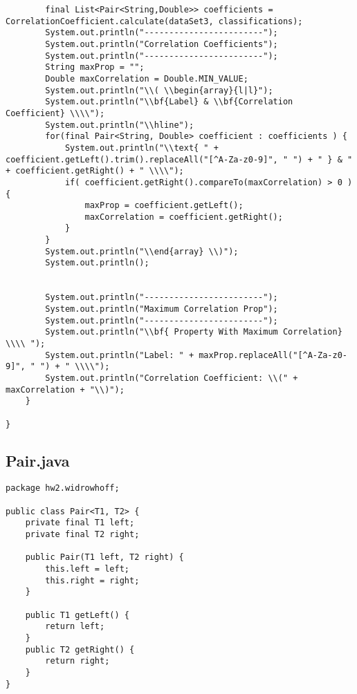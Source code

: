 \begin{lstlisting}
		final List<Pair<String,Double>> coefficients = CorrelationCoefficient.calculate(dataSet3, classifications);
		System.out.println("------------------------");
		System.out.println("Correlation Coefficients");
		System.out.println("------------------------");
		String maxProp = "";
		Double maxCorrelation = Double.MIN_VALUE;
		System.out.println("\\( \\begin{array}{l|l}");
		System.out.println("\\bf{Label} & \\bf{Correlation Coefficient} \\\\");
		System.out.println("\\hline");
		for(final Pair<String, Double> coefficient : coefficients ) {
			System.out.println("\\text{ " + coefficient.getLeft().trim().replaceAll("[^A-Za-z0-9]", " ") + " } & " + coefficient.getRight() + " \\\\");
			if( coefficient.getRight().compareTo(maxCorrelation) > 0 ) {
				maxProp = coefficient.getLeft();
				maxCorrelation = coefficient.getRight();
			}
		}
		System.out.println("\\end{array} \\)");
		System.out.println();

		
		System.out.println("------------------------");
		System.out.println("Maximum Correlation Prop");
		System.out.println("------------------------");
		System.out.println("\\bf{ Property With Maximum Correlation} \\\\ ");
		System.out.println("Label: " + maxProp.replaceAll("[^A-Za-z0-9]", " ") + " \\\\");
		System.out.println("Correlation Coefficient: \\(" + maxCorrelation + "\\)");
	}

}
\end{lstlisting}

\subsection{Pair.java}
\begin{lstlisting}
package hw2.widrowhoff;

public class Pair<T1, T2> {
	private final T1 left;
	private final T2 right;
	
	public Pair(T1 left, T2 right) {
		this.left = left;
		this.right = right;
	}
	
	public T1 getLeft() {
		return left;
	}
	public T2 getRight() {
		return right;
	}
}
\end{lstlisting}

